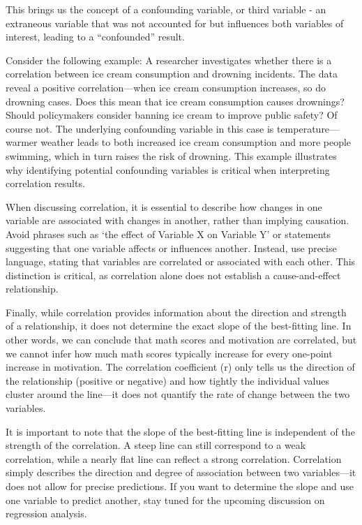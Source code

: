 \documentclass[
  letterpaper,
  DIV=11,
  numbers=noendperiod]{scrreprt}
\begin{document}
This brings us the concept of a confounding variable, or third variable
- an extraneous variable that was not accounted for but influences both
variables of interest, leading to a ``confounded'' result.

Consider the following example: A researcher investigates whether there
is a correlation between ice cream consumption and drowning incidents.
The data reveal a positive correlation---when ice cream consumption
increases, so do drowning cases. Does this mean that ice cream
consumption causes drownings? Should policymakers consider banning ice
cream to improve public safety? Of course not. The underlying
confounding variable in this case is temperature---warmer weather leads
to both increased ice cream consumption and more people swimming, which
in turn raises the risk of drowning. This example illustrates why
identifying potential confounding variables is critical when
interpreting correlation results.

When discussing correlation, it is essential to describe how changes in
one variable are associated with changes in another, rather than
implying causation. Avoid phrases such as `the effect of Variable X on
Variable Y' or statements suggesting that one variable affects or
influences another. Instead, use precise language, stating that
variables are correlated or associated with each other. This distinction
is critical, as correlation alone does not establish a cause-and-effect
relationship.

Finally, while correlation provides information about the direction and
strength of a relationship, it does not determine the exact slope of the
best-fitting line. In other words, we can conclude that math scores and
motivation are correlated, but we cannot infer how much math scores
typically increase for every one-point increase in motivation. The
correlation coefficient (r) only tells us the direction of the
relationship (positive or negative) and how tightly the individual
values cluster around the line---it does not quantify the rate of change
between the two variables.

It is important to note that the slope of the best-fitting line is
independent of the strength of the correlation. A steep line can still
correspond to a weak correlation, while a nearly flat line can reflect a
strong correlation. Correlation simply describes the direction and
degree of association between two variables---it does not allow for
precise predictions. If you want to determine the slope and use one
variable to predict another, stay tuned for the upcoming discussion on
regression analysis.
\end{document}
